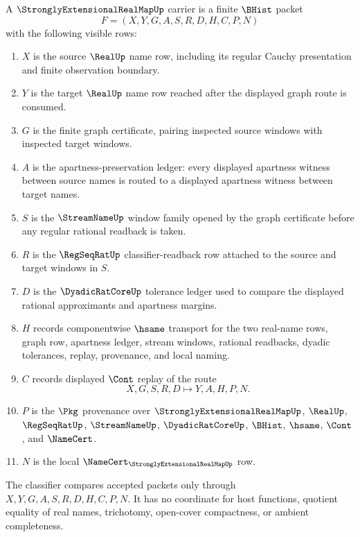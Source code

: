 \begin{definition}
\label{def:strongly-extensional-real-map-carrier}
A $\StronglyExtensionalRealMapUp$ carrier is a finite $\BHist$ packet
$$
F=(X,Y,G,A,S,R,D,H,C,P,N)
$$
with the following visible rows:
\begin{enumerate}
\item $X$ is the source $\RealUp$ name row, including its regular Cauchy presentation and finite observation boundary.
\item $Y$ is the target $\RealUp$ name row reached after the displayed graph route is consumed.
\item $G$ is the finite graph certificate, pairing inspected source windows with inspected target windows.
\item $A$ is the apartness-preservation ledger: every displayed apartness witness between source names is routed to a displayed apartness witness between target names.
\item $S$ is the $\StreamNameUp$ window family opened by the graph certificate before any regular rational readback is taken.
\item $R$ is the $\RegSeqRatUp$ classifier-readback row attached to the source and target windows in $S$.
\item $D$ is the $\DyadicRatCoreUp$ tolerance ledger used to compare the displayed rational approximants and apartness margins.
\item $H$ records componentwise $\hsame$ transport for the two real-name rows, graph row, apartness ledger, stream windows, rational readbacks, dyadic tolerances, replay, provenance, and local naming.
\item $C$ records displayed $\Cont$ replay of the route
$$
X,G,S,R,D \longmapsto Y,A,H,P,N .
$$
\item $P$ is the $\Pkg$ provenance over $\StronglyExtensionalRealMapUp$, $\RealUp$, $\RegSeqRatUp$, $\StreamNameUp$, $\DyadicRatCoreUp$, $\BHist$, $\hsame$, $\Cont$, and $\NameCert$.
\item $N$ is the local $\NameCert_{\StronglyExtensionalRealMapUp}$ row.
\end{enumerate}
The classifier compares accepted packets only through $X,Y,G,A,S,R,D,H,C,P,N$. It has no coordinate for host functions, quotient equality of real names, trichotomy, open-cover compactness, or ambient completeness.
\end{definition}

